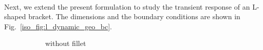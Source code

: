 \paragraph{}
Next, we extend the present formulation to study the transient response of an L-shaped bracket.
The dimensions and the boundary conditions are shown in Fig.~\ref{iso_fig:l_dynamic_geo_bc}.
    \begin{figure}
        \begin{subfigure}[b]{1\linewidth}
            \centering
            \caption{without fillet}
        \end{subfigure}
        \begin{subfigure}[b]{1\linewidth}
            \centering
            \scalebox{0.8}{
}
\end{subfigure}
\end{figure}
